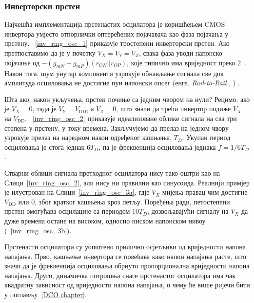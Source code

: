 \documentclass[master]{finthesis}
\makeatletter
\newcommand*{\engl}[2][\@empty]{%
    \edef\theacronym{#1}%
    (енгл. \foreignlanguage{english}{\emph{#2}%
    \ifx\theacronym\@empty \else , #1\fi})%
}
\makeatother
\begin{document}
\subsubsection{Инверторски прстен}
Најчешћа имплементација прстенастих осцилатора је коришћењем CMOS инвертора умјесто отпорнички оптерећених појачавача као фаза појачања у прстену. \figurename~\ref{inv_ring_osc_1} приказује тростепени инверторски прстен. Ако претпоставимо да је у почетку $V_{X} = V_{Y} = V_{Z}$, свака фаза уводи напонско појачање од $-(g_{mN}+g_{mP})(r_{ON}||r_{OP})$, које типично има вриједност преко 2~\cite{Razavi:PLL_CMOS_2020}. Након тога, шум унутар компоненти узрокује обнављање сигнала све док амплитуда осциловања не достигне пун напонски опсег \engl{Rail-to-Rail}. \par

Шта ако, након укључења, прстен почиње са једним чвором на нули? Рецимо, ако је $V_{X}=0$, тада је $V_{Y}=V_\text{DD}$, а $V_{Z}=0$, што значи да трећи инвертор подиже $V_{X}$ на $V_\text{DD}$. \figurename~\ref{inv_ring_osc_2} приказује идеализоване облике сигнала на сва три степена у прстену, у току времена. Закључујемо да прелаз на једном чвору узрокује прелаз на наредном након одређеног кашњења, $T_{D}$. Укупан период осциловања је стога једнак $6T_{D}$, па је фреквенција осциловања једнака $f=1/6T_{D}$.\par

Стварни облици сигнала претходног осцилатора нису тако оштри као на Слици~\ref{inv_ring_osc_2}, али нису ни правилни као синусоида. Реалнији примјер је илустрован на Слици~\ref{inv_ring_osc_3a}, гдје $V_{X}$ мијења правац чим достигне $V_\text{DD}$ или 0, због кратког кашњења кроз петљу. Поређења ради, петостепени прстен омогућава осцилације са периодом $10T_{D}$, дозвољавајући сигналу на $V_{X}$ да дуже времена остане на високом, односно ниском напонском нивоу (\figurename~\ref{inv_ring_osc_3b}). \par

Прстенасти осцилатори су уопштено прилично осјетљиви од вриједности напона напајања. Прво, кашњење инвертора се повећава како напон напајања расте, што значи да је фреквенција осциловања обрнуто пропорционална вриједности напона напајања. Друго, динамичка потрошња снаге прстенастог осцилатора има чак квадратну зависност од вриједности напона напајања, о чему ће више ријечи бити у поглављу~\ref{DCO chapter}.
\end{document}
